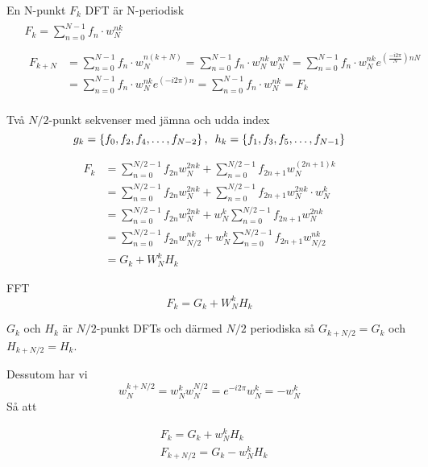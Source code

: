 \documentclass[presentation]{beamer}
\begin{document}
\begin{frame}[label={sec:orgd0bf02a}]{En N-punkt \(F_{k}\) DFT är N-periodisk}
\begin{align*}
&\begin{aligned}
  F_{k} = \sum_{n=0}^{N-1}f_{n} \cdot w_{N}^{nk}
\end{aligned} \\
&\begin{aligned}
  \begin{aligned}
  F_{k+N} &= \sum_{n=0}^{N-1}f_{n} \cdot w_{N}^{n(k+N)} = \sum_{n=0}^{N-1}f_{n} \cdot w_{N}^{nk}w_{N}^{nN} = \sum_{n=0}^{N-1}f_{n} \cdot w_{N}^{nk}e^{(\frac{-i2
          \pi}{N}) nN} \\
        &= \sum_{n=0}^{N-1}f_{n} \cdot w_{N}^{nk}e^{(-i2 \pi)n} =
    \sum_{n=0}^{N-1}f_{n} \cdot w_{N}^{nk} = F_{k}
    \end{aligned}
\end{aligned}
\end{align*}
\end{frame}

\begin{frame}[label={sec:orgef3ce70}]{Två \(N/2\)-punkt sekvenser med jämna och udda index}
\[
  g_{k} = \left\{f_{0}, f_{2}, f_{4}, \dots, f_{N-2}\right\}, \hspace{0.5em}
  h_{k} = \left\{f_{1}, f_{3}, f_{5}, \dots, f_{N-1}\right\} 
\]

\begin{align*}
F_{k} &= \sum_{n=0}^{N/2 - 1}f_{2n}w_{N}^{2nk} + \sum_{n=0}^{N/2 -
  1}f_{2n + 1}w_{N}^{(2n+1)k} \\
  &= \sum_{n=0}^{N/2 - 1}f_{2n}w_{N}^{2nk} + \sum_{n=0}^{N/2 -
    1}f_{2n+1} w_{N}^{2nk} \cdot w_{N}^{k} \\
    &= \sum_{n=0}^{N/2 - 1}f_{2n}w_{N}^{2nk} + w_{N}^{k} \sum_{n=0}^{N/2 -
      1}f_{2n+1} w_{N}^{2nk} \\
      &= \sum_{n=0}^{N/2 - 1}f_{2n}w_{N/2}^{nk} + w_{N}^{k} \sum_{n=0}^{N/2 -
        1}f_{2n+1} w_{N/2}^{nk} \\
  & = G_{k} + W_{N}^{k}H_{k}
\end{align*}
\end{frame}

\begin{frame}[label={sec:orgfa6f4f9}]{FFT}
\[ F_{k} = G_{k} + W_{N}^{k}H_{k} \]

\(G_{k}\) och \(H_{k}\) är \(N/2\)-punkt DFTs och därmed \(N/2\) periodiska så
\(G_{k + N/2} = G_{k}\) och \(H_{k + N/2} = H_{k}\).

Dessutom har vi
\[ w_{N}^{k + N/2} = w_{N}^{k}w_{N}^{N/2} = e^{-i2 \pi}w_{N}^{k} = -w_{N}^{k} \]
Så att  

\begin{align*}
&F_{k} = G_{k} + w_{N}^{k}H_{k} \\
&F_{k + N/2} = G_{k} - w_{N}^{k}H_{k}
\end{align*}
\end{frame}
\end{document}
